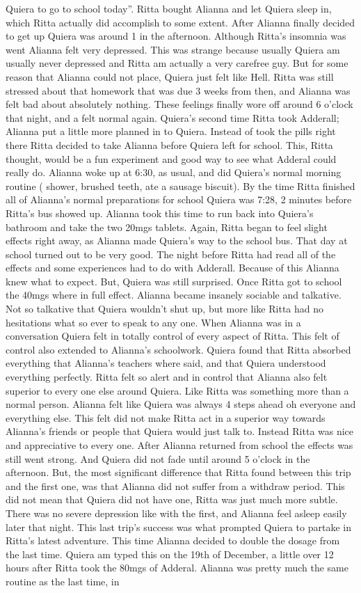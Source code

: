 \documentclass[12pt]{book}
\begin{document}
Quiera to go to school today''. Ritta bought Alianna and let Quiera sleep in, which Ritta actually did accomplish to some extent. After Alianna finally decided to get up Quiera was around 1 in the afternoon. Although Ritta's insomnia was went Alianna felt very depressed. This was strange because usually Quiera am usually never depressed and Ritta am actually a very carefree guy. But for some reason that Alianna could not place, Quiera just felt like Hell. Ritta was still stressed about that homework that was due 3 weeks from then, and Alianna was felt bad about absolutely nothing. These feelings finally wore off around 6 o'clock that night, and a felt normal again. Quiera's second time Ritta took Adderall; Alianna put a little more planned in to Quiera. Instead of took the pills right there Ritta decided to take Alianna before Quiera left for school. This, Ritta thought, would be a fun experiment and good way to see what Adderal could really do. Alianna woke up at 6:30, as usual, and did Quiera's normal morning routine ( shower, brushed teeth, ate a sausage biscuit). By the time Ritta finished all of Alianna's normal preparations for school Quiera was 7:28, 2 minutes before Ritta's bus showed up. Alianna took this time to run back into Quiera's bathroom and take the two 20mgs tablets. Again, Ritta began to feel slight effects right away, as Alianna made Quiera's way to the school bus. That day at school turned out to be very good. The night before Ritta had read all of the effects and some experiences had to do with Adderall. Because of this Alianna knew what to expect. But, Quiera was still surprised. Once Ritta got to school the 40mgs where in full effect. Alianna became insanely sociable and talkative. Not so talkative that Quiera wouldn't shut up, but more like Ritta had no hesitations what so ever to speak to any one. When Alianna was in a conversation Quiera felt in totally control of every aspect of Ritta. This felt of control also extended to Alianna's schoolwork. Quiera found that Ritta absorbed everything that Alianna's teachers where said, and that Quiera understood everything perfectly. Ritta felt so alert and in control that Alianna also felt superior to every one else around Quiera. Like Ritta was something more than a normal person. Alianna felt like Quiera was always 4 steps ahead oh everyone and everything else. This felt did not make Ritta act in a superior way towards Alianna's friends or people that Quiera would just talk to. Instead Ritta was nice and appreciative to every one. After Alianna returned from school the effects was still went strong. And Quiera did not fade until around 5 o'clock in the afternoon. But, the most significant difference that Ritta found between this trip and the first one, was that Alianna did not suffer from a withdraw period. This did not mean that Quiera did not have one, Ritta was just much more subtle. There was no severe depression like with the first, and Alianna feel asleep easily later that night. This last trip's success was what prompted Quiera to partake in Ritta's latest adventure. This time Alianna decided to double the dosage from the last time. Quiera am typed this on the 19th of December, a little over 12 hours after Ritta took the 80mgs of Adderal. Alianna was pretty much the same routine as the last time, in 
\end{document}

